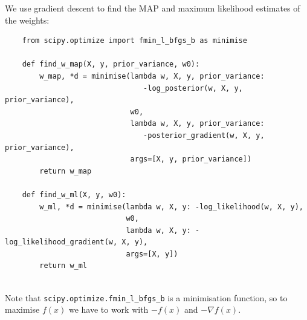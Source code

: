 \documentclass[a4paper]{article}
\begin{document}
    We use gradient descent to find the MAP and maximum likelihood estimates of the weights:
    \begin{verbatim}
    from scipy.optimize import fmin_l_bfgs_b as minimise

    def find_w_map(X, y, prior_variance, w0):
        w_map, *d = minimise(lambda w, X, y, prior_variance:
                                -log_posterior(w, X, y, prior_variance),
                             w0,
                             lambda w, X, y, prior_variance:
                                -posterior_gradient(w, X, y, prior_variance),
                             args=[X, y, prior_variance])
        return w_map

    def find_w_ml(X, y, w0):
        w_ml, *d = minimise(lambda w, X, y: -log_likelihood(w, X, y),
                            w0,
                            lambda w, X, y: -log_likelihood_gradient(w, X, y),
                            args=[X, y])
        return w_ml


    \end{verbatim}
    Note that \verb`scipy.optimize.fmin_l_bfgs_b` is a minimisation function, so to maximise $f(x)$ we have to work with $-f(x)$ and $-\nabla f(x)$.
\end{document}
